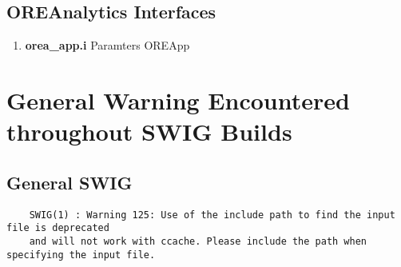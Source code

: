 \documentclass[10pt]{article}
\begin{document}
\begin{multicols}{2}
\begin{enumerate}
                
    \end{enumerate}
\end{multicols}

\pagebreak

\subsection*{OREAnalytics Interfaces}

    \begin{enumerate}
            \item \textbf{orea\_app.i}
                \subitem Paramters
                \subitem OREApp
    \end{enumerate}


\pagebreak
\section*{General Warning Encountered throughout SWIG Builds}
\subsection{General SWIG}
\begin{verbatim}
    SWIG(1) : Warning 125: Use of the include path to find the input file is deprecated 
    and will not work with ccache. Please include the path when specifying the input file.
\end{verbatim}
\end{document}
